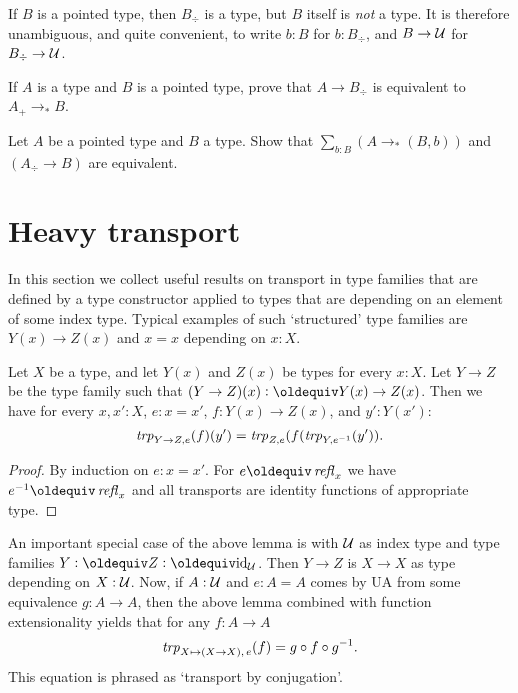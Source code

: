 If $B$ is a pointed type, then $B_\div $ is a type, but $B$ itself is
\emph{not} a type. It is therefore unambiguous, and quite convenient,
to write $b:B$ for $b:B_\div$, and $B\to\mathcal{U}$ for $B_\div\to\mathcal{U}$.

\begin{xca}\label{xca:plusforgetadjoint}
If $A$ is a type and $B$ is a pointed type, 
prove that $A\to B_\div$ is equivalent to $A_+\to_*B$.
\end{xca}

\begin{xca}\label{xca:freemaps}
  Let $A$ be a pointed type and $B$ a type.  Show that  
$\sum_{b:B}(A\to_*(B,b))$ and $(A_\div\to B)$ are equivalent.
\end{xca}


\section{Heavy transport}
\label{sec:heavy-transport}

In this section we collect useful results on transport in
type families that are defined by a type constructor applied
to types that are depending on an element of some index type.
Typical examples of such `structured' type families are 
$Y(x)\to Z(x)$ and $x=x$ depending on $x:X$.

\begin{lemma}\label{lem:trp-in-function-type}
Let $X$ be a type, and let $Y(x)$ and $Z(x)$ be types for every $x:X$.
Let $Y\to Z$ be the type family such that $(Y\to Z)(x) \defeq Y(x)\to Z(x)$.
Then we have for every $x,x':X$, $e: x=x'$, $f: Y(x)\to Z(x)$, and $y':Y(x')$:
\[
\mathord{\mathit{trp}}_{Y\to Z, e} (f)(y') = \mathord{\mathit{trp}}_{Z,e} (f(\mathord{\mathit{trp}}_{Y, e^{-1}}(y')).
\]
\end{lemma}
\begin{proof}
By induction on $e: x=x'$. For $e \jdeq \refl{x}$ we have $e^{-1}\jdeq \refl{x}$
and all transports are identity functions of appropriate type. 
\end{proof}

An important special case of the above lemma is with $\mathcal{U}$
as index type and type families $Y\defeq Z\defeq \id_\UU$.
Then $Y\to Z$ is $X\to X$ as type depending on $X:\mathcal{U}$. Now, 
if $A:\mathcal{U}$ and $e: A=A$ comes by UA from some equivalence 
$g:A\to A$, then the above lemma combined with function extensionality 
yields that for any $f: A\to A$
\[
\mathord{\mathit{trp}}_{X\mapsto(X\to X),\,e} (f) = g\circ f \circ g^{-1}.
\]
This equation is phrased as `transport by conjugation'.

